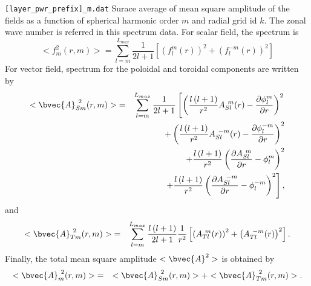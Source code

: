 \begin{description}
\item{\tt [layer\_pwr\_prefix]\_m.dat} Surace average of mean square amplitude of the fields as a function of spherical harmonic order $m$ and radial grid id $k$. The zonal wave number is referred in this spectrum data. For scalar field, the spectrum is
%
\begin{equation}
<f_{m}^{2}(r,m)> = \sum_{l=m}^{L_{max}}  \frac{1}{2l + 1} \left[ \left(f_{l}^{m}(r) \right)^2 
+ \left(f_{l}^{-m}(r) \right)^2 \right]
\end{equation}
%
For vector field, spectrum for the poloidal and toroidal components are written by 
%
\begin{eqnarray}
<\bvec{A}_{Sm}^{\ 2}(r,m)> &=&   \sum_{l=m}^{L_{max}} \frac{1}{2l + 1}
\left[  \left(\frac{l\left(l+1 \right) }{r^{2}} A_{Sl}^{\ m}(r) - \frac{\partial \phi_{l}^{m}}{\partial r} \right)^{2} 
\right. \nonumber \\
& & + \left(\frac{l\left(l+1 \right) }{r^{2}} A_{Sl}^{\ -m}(r) - \frac{\partial \phi_{l}^{-m}}{\partial r} \right)^{2} 
\nonumber \\
& & +  \frac{l \left( l+1 \right)}{r^{2}} \left( \frac{\partial A_{Sl}^{\ m}}{\partial r} - \phi_{l}^{m} \right)^{2} 
\nonumber \\
& & \left. +  \frac{l \left( l+1 \right)}{r^{2}} \left( \frac{\partial A_{Sl}^{\ -m}}{\partial r} - \phi_{l}^{-m} \right)^{2} \right],
\end{eqnarray}
%
and
\begin{eqnarray}
<\bvec{A}_{Tm}^{\ 2}(r,m)> &=&  \sum_{l=m}^{L_{max}} \frac{l \left( l+1 \right)}{2l + 1} \frac{1}{r^{2}} 
\left[ \left( A_{Tl}^{\ m}(r) \right)^{2} +  \left( A_{Tl}^{\ -m}(r) \right)^{2} \right].
\end{eqnarray}
Finally, the total mean square amplitude $<\bvec{A}^{2}> $ is obtained by
\begin{eqnarray}
<\bvec{A}_{m}^{\ 2}(r,m)> &=& <\bvec{A}_{Sm}^{\ 2}(r,m)>  + <\bvec{A}_{Tm}^{\ 2}(r,m)>.
\end{eqnarray}


\end{description}
